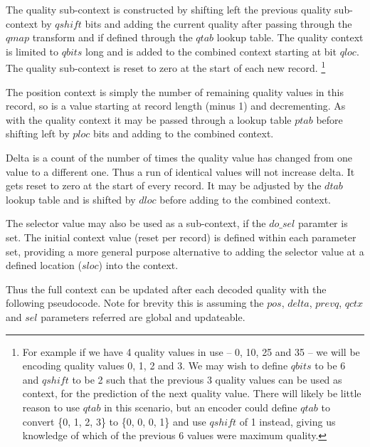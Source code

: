 \documentclass[a4paper]{article}
\begin{document}
The quality sub-context is constructed by shifting left the previous
quality sub-context by $qshift$ bits and adding the current quality
after passing through the $qmap$ transform and if defined
through the $qtab$ lookup table.  The quality context is limited to
$qbits$ long and is added to the combined context starting at bit
$qloc$.  The quality sub-context is reset to zero at the start of each
new record.
\footnote{For example if we have 4 quality values in use -- 0, 10, 25 and
35 -- we will be encoding quality values 0, 1, 2 and 3.  We may wish to
define $qbits$ to be 6 and $qshift$ to be 2 such that the previous 3
quality values can be used as context, for the prediction of the next
quality value.  There will likely be little reason to use $qtab$ in
this scenario, but an encoder could define $qtab$ to convert \{0, 1, 2, 3\}
to \{0, 0, 0, 1\} and use $qshift$ of 1 instead, giving us
knowledge of which of the previous 6 values were maximum quality.}

The position context is simply the number of remaining quality values
in this record, so is a value starting at record length (minus 1) and
decrementing.  As with the quality context it may be passed through a
lookup table $ptab$ before shifting left by $ploc$ bits and adding to
the combined context.

Delta is a count of the number of times the quality value has changed
from one value to a different one.  Thus a run of identical values
will not increase delta.  It gets reset to zero at the start of every
record.  It may be adjusted by the $dtab$ lookup table and is shifted
by $dloc$ before adding to the combined context.

The selector value may also be used as a sub-context, if the $do\_sel$
paramter is set.  The initial context value (reset per record) is
defined within each parameter set, providing a more general purpose
alternative to adding the selector value at a defined location
($sloc$) into the context.

Thus the full context can be updated after each decoded quality with
the following pseudocode.  Note for brevity this is assuming the
$pos$, $delta$, $prevq$, $qctx$ and $sel$ parameters referred are global and updateable.
\end{document}
